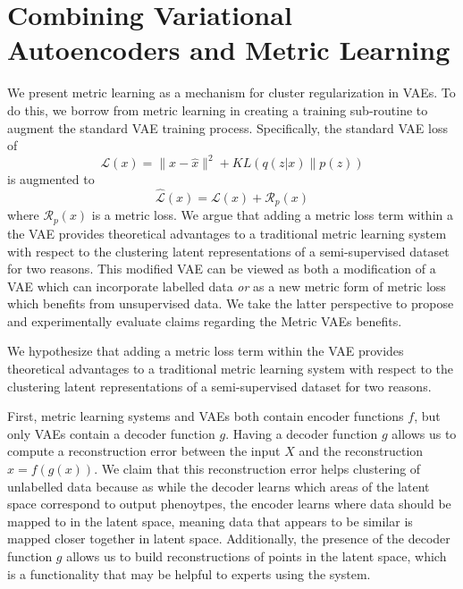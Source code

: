\section{Combining Variational Autoencoders and Metric Learning}
    We present metric learning as a mechanism for cluster regularization in VAEs. To do this, we borrow from metric learning in creating a training sub-routine to augment the standard VAE training process. Specifically, the standard VAE loss of 
    \begin{equation*}
    \mathcal L(x)=\|x-\hat x\|^2+KL(q(z|x)\|p(z))    
    \end{equation*}
    is augmented to 
    \begin{equation*}
    \hat{\mathcal L}(x)=\mathcal{L}(x)+\mathcal{R}_p(x)    
    \end{equation*}
    where $\mathcal{R}_p(x)$ is a metric loss. We argue that adding a metric loss term within a the VAE provides theoretical advantages to a traditional metric learning system with respect to the clustering latent representations of a semi-supervised dataset for two reasons. This modified VAE can be viewed as both a modification of a VAE which can incorporate labelled data \emph{or} as a new metric form of metric loss which benefits from unsupervised data. We take the latter perspective to propose and experimentally evaluate claims regarding the Metric VAEs benefits.
    
    We hypothesize that adding a metric loss term within the VAE provides theoretical advantages to a traditional metric learning system with respect to the clustering latent representations of a semi-supervised dataset for two reasons. 

    First, metric learning systems and VAEs both contain encoder functions $f$, but only VAEs contain a decoder function $g$. Having a decoder function $g$ allows us to compute a reconstruction error between the input $X$ and the reconstruction $\hat x=f(g(x))$. We claim that this reconstruction error helps clustering of unlabelled data because as while the decoder learns which areas of the latent space correspond to output phenoytpes, the encoder learns where data should be mapped to in the latent space, meaning data that appears to be similar is mapped closer together in latent space. Additionally, the presence of the decoder function $g$ allows us to build reconstructions of points in the latent space, which is a functionality that may be helpful to experts using the system.
    
